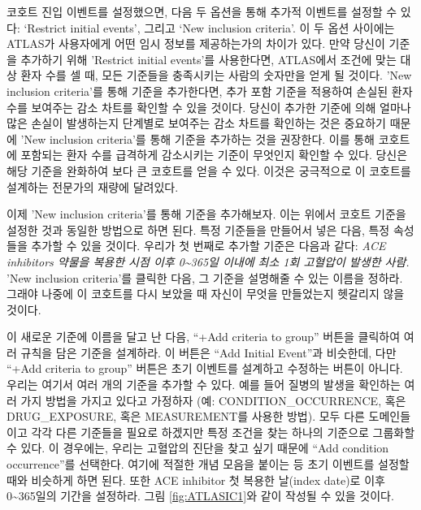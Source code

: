 \documentclass[11pt]{book}
\theoremstyle{definition}
\theoremstyle{definition}
\theoremstyle{definition}
\theoremstyle{remark}
\begin{document}
코호트 진입 이벤트를 설정했으면, 다음 두 옵션을 통해 추가적 이벤트를
설정할 수 있다: `Restrict initial events', 그리고 `New inclusion
criteria'. 이 두 옵션 사이에는 ATLAS가 사용자에게 어떤 임시 정보를
제공하는가의 차이가 있다. 만약 당신이 기준을 추가하기 위해 'Restrict
initial events'를 사용한다면, ATLAS에서 조건에 맞는 대상 환자 수를 셀
때, 모든 기준들을 충족시키는 사람의 숫자만을 얻게 될 것이다. 'New
inclusion criteria'를 통해 기준을 추가한다면, 추가 포함 기준을 적용하여
손실된 환자 수를 보여주는 감소 차트를 확인할 수 있을 것이다. 당신이
추가한 기준에 의해 얼마나 많은 손실이 발생하는지 단계별로 보여주는 감소
차트를 확인하는 것은 중요하기 때문에 'New inclusion criteria'를 통해
기준을 추가하는 것을 권장한다. 이를 통해 코호트에 포함되는 환자 수를
급격하게 감소시키는 기준이 무엇인지 확인할 수 있다. 당신은 해당 기준을
완화하여 보다 큰 코호트를 얻을 수 있다. 이것은 궁극적으로 이 코호트를
설계하는 전문가의 재량에 달려있다.

이제 'New inclusion criteria'를 통해 기준을 추가해보자. 이는 위에서
코호트 기준을 설정한 것과 동일한 방법으로 하면 된다. 특정 기준들을
만들어서 넣은 다음, 특정 속성들을 추가할 수 있을 것이다. 우리가 첫
번째로 추가할 기준은 다음과 같다: \emph{ACE inhibitors 약물을 복용한
시점 이후 0\textasciitilde{}365일 이내에 최소 1회 고혈압이 발생한 사람.}
'New inclusion criteria'를 클릭한 다음, 그 기준을 설명해줄 수 있는
이름을 정하라. 그래야 나중에 이 코호트를 다시 보았을 때 자신이 무엇을
만들었는지 헷갈리지 않을 것이다.

이 새로운 기준에 이름을 달고 난 다음, ``+Add criteria to group'' 버튼을
클릭하여 여러 규칙을 담은 기준을 설계하라. 이 버튼은 ``Add Initial
Event''과 비슷한데, 다만 ``+Add criteria to group'' 버튼은 초기 이벤트를
설계하고 수정하는 버튼이 아니다. 우리는 여기서 여러 개의 기준을 추가할
수 있다. 예를 들어 질병의 발생을 확인하는 여러 가지 방법을 가지고 있다고
가정하자 (예: CONDITION\_OCCURRENCE, 혹은 DRUG\_EXPOSURE, 혹은
MEASUREMENT를 사용한 방법). 모두 다른 도메인들이고 각각 다른 기준들을
필요로 하겠지만 특정 조건을 찾는 하나의 기준으로 그룹화할 수 있다. 이
경우에는, 우리는 고혈압의 진단을 찾고 싶기 때문에 ``Add condition
occurrence''를 선택한다. 여기에 적절한 개념 모음을 붙이는 등 초기
이벤트를 설정할 때와 비슷하게 하면 된다. 또한 ACE inhibitor 첫 복용한
날(index date)로 이후 0\textasciitilde{}365일의 기간을 설정하라. 그림
\ref{fig:ATLASIC1}와 같이 작성될 수 있을 것이다.
\end{document}
